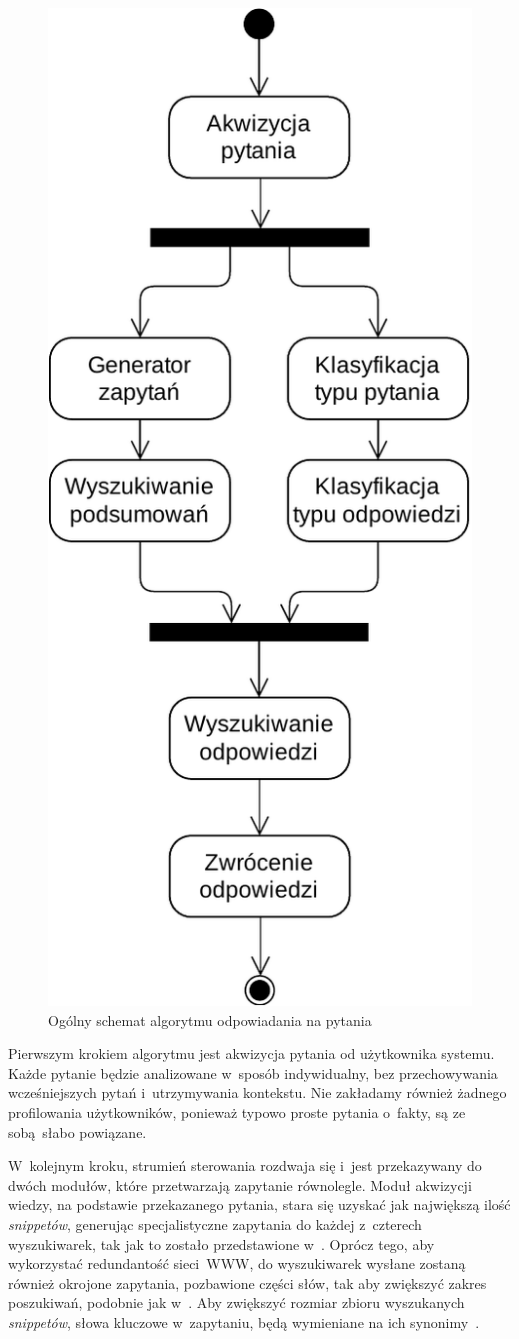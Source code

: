 \begin{figure}[h]
    \centering
    \includegraphics[width=0.6\columnwidth]{figures/WEDT-Algorytm.pdf}
    \caption{Ogólny schemat algorytmu odpowiadania na pytania}
    \label{fig:algorithm-overview}
\end{figure}

Pierwszym krokiem algorytmu jest akwizycja pytania od użytkownika systemu. Każde pytanie będzie analizowane w~sposób indywidualny, bez przechowywania wcześniejszych pytań i~utrzymywania kontekstu. Nie zakładamy również żadnego profilowania użytkowników, ponieważ typowo proste pytania o~fakty, są ze sobą słabo powiązane.

W~kolejnym kroku, strumień sterowania rozdwaja się i~jest przekazywany do dwóch modułów, które przetwarzają zapytanie równolegle. Moduł akwizycji wiedzy, na podstawie przekazanego pytania, stara się uzyskać jak największą ilość \emph{snippetów}, generując specjalistyczne zapytania do każdej z~czterech wyszukiwarek, tak jak to zostało przedstawione w~\cite{zheng2002answerbus}. Oprócz tego, aby wykorzystać redundantość sieci~WWW, do wyszukiwarek wysłane zostaną również okrojone zapytania, pozbawione części słów, tak aby zwiększyć zakres poszukiwań, podobnie jak w~\cite{brill2002analysis}. Aby zwiększyć rozmiar zbioru wyszukanych \emph{snippetów}, słowa kluczowe w~zapytaniu, będą wymieniane na ich synonimy~\cite{przybyla-2013-question}.

